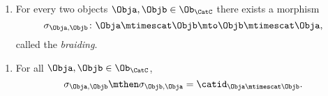 {\begin{ctdefinition}
        \constit
        
        \begin{enumerate}
        \item For every two objects $\Obja, \Objb \in \Ob_\CatC$ there exists a morphism 
        \begin{equation}
        \sigma_{\Obja, \Objb} \colon \Obja \mtimescat   \Objb \mto \Objb \mtimescat   \Obja,
        \end{equation}
        called the \emph{braiding}.
        \end{enumerate}
        
        \condit
        
        \begin{enumerate} 
        \item For all $\Obja, \Objb \in \Ob_\CatC$,
        \begin{equation}
        \sigma_{\Obja, \Objb} \mthen \sigma_{\Objb, \Obja} = \catid_{\Obja \mtimescat   \Objb}.
        \end{equation}
        \end{enumerate}
        
       
    \end{ctdefinition}

    
      

    
      

}

